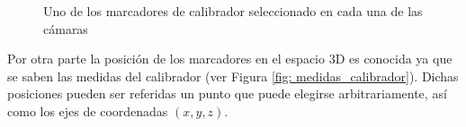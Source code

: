 \begin{figure}[ht!]
      
      \caption{Uno de los marcadores de calibrador seleccionado en cada una de las cámaras}
      \label{fig: vistas_calibrador}      
\end{figure}


Por otra parte la posición de los marcadores en el espacio 3D es conocida ya que se saben las medidas del calibrador (ver Figura \ref{fig: medidas_calibrador}). Dichas posiciones pueden ser referidas un punto que puede elegirse arbitrariamente, así como los ejes de coordenadas $(x,y,z)$.

